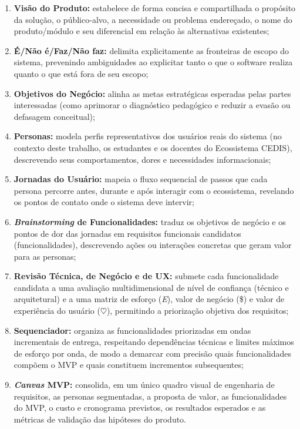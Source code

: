 \begin{enumerate}
    \item \textbf{Visão do Produto:} estabelece de forma concisa e compartilhada o propósito da solução, o público-alvo, a necessidade ou problema endereçado, o nome do produto/módulo e seu diferencial em relação às alternativas existentes;
    \item \textbf{É/Não é/Faz/Não faz:} delimita explicitamente as fronteiras de escopo do sistema, prevenindo ambiguidades ao explicitar tanto o que o software realiza quanto o que está fora de seu escopo;
    \item \textbf{Objetivos do Negócio:} alinha as metas estratégicas esperadas pelas partes interessadas (como aprimorar o diagnóstico pedagógico e reduzir a evasão ou defasagem conceitual);
    \item \textbf{Personas:} modela perfis representativos dos usuários reais do sistema (no contexto deste trabalho, os estudantes e os docentes do Ecossistema CEDIS), descrevendo seus comportamentos, dores e necessidades informacionais;
    \item \textbf{Jornadas do Usuário:} mapeia o fluxo sequencial de passos que cada persona percorre antes, durante e após interagir com o ecossistema, revelando os pontos de contato onde o sistema deve intervir;
    \item \textbf{\textit{Brainstorming} de Funcionalidades:} traduz os objetivos de negócio e os pontos de dor das jornadas em requisitos funcionais candidatos (funcionalidades), descrevendo ações ou interações concretas que geram valor para as personas;
    \item \textbf{Revisão Técnica, de Negócio e de UX:} submete cada funcionalidade candidata a uma avaliação multidimensional de nível de confiança (técnico e arquitetural) e a uma matriz de esforço (\textit{E}), valor de negócio (\$) e valor de experiência do usuário ($\heartsuit$), permitindo a priorização objetiva dos requisitos;
    \item \textbf{Sequenciador:} organiza as funcionalidades priorizadas em ondas incrementais de entrega, respeitando dependências técnicas e limites máximos de esforço por onda, de modo a demarcar com precisão quais funcionalidades compõem o MVP e quais constituem incrementos subsequentes;
    \item \textbf{\textit{Canvas} MVP:} consolida, em um único quadro visual de engenharia de requisitos, as personas segmentadas, a proposta de valor, as funcionalidades do MVP, o custo e cronograma previstos, os resultados esperados e as métricas de validação das hipóteses do produto.
\end{enumerate}


